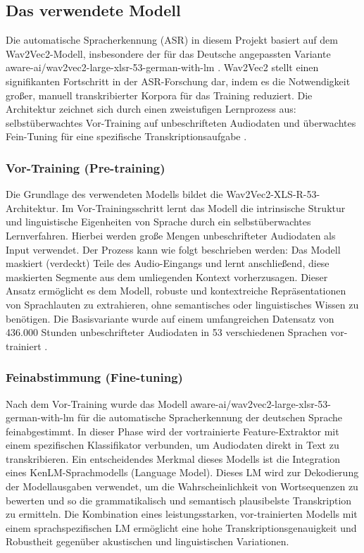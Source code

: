 \subsection{Das verwendete Modell}

Die automatische Spracherkennung (ASR) in diesem Projekt basiert auf dem Wav2Vec2-Modell, insbesondere der für das Deutsche angepassten Variante aware-ai/wav2vec2-large-xlsr-53-german-with-lm \cite{aware-ai_n.d.}. Wav2Vec2 stellt einen signifikanten Fortschritt in der ASR-Forschung dar, indem es die Notwendigkeit großer, manuell transkribierter Korpora für das Training reduziert. Die Architektur zeichnet sich durch einen zweistufigen Lernprozess aus: selbstüberwachtes Vor-Training auf unbeschrifteten Audiodaten und überwachtes Fein-Tuning für eine spezifische Transkriptionsaufgabe \cite{baevski2020wav2vec}.

\subsubsection{Vor-Training (Pre-training)}

Die Grundlage des verwendeten Modells bildet die Wav2Vec2-XLS-R-53-Architektur. Im Vor-Trainingsschritt lernt das Modell die intrinsische Struktur und linguistische Eigenheiten von Sprache durch ein selbstüberwachtes Lernverfahren. Hierbei werden große Mengen unbeschrifteter Audiodaten als Input verwendet. Der Prozess kann wie folgt beschrieben werden: Das Modell maskiert (verdeckt) Teile des Audio-Eingangs und lernt anschließend, diese maskierten Segmente aus dem umliegenden Kontext vorherzusagen. Dieser Ansatz ermöglicht es dem Modell, robuste und kontextreiche Repräsentationen von Sprachlauten zu extrahieren, ohne semantisches oder linguistisches Wissen zu benötigen. Die Basisvariante wurde auf einem umfangreichen Datensatz von 436.000 Stunden unbeschrifteter Audiodaten in 53 verschiedenen Sprachen vor-trainiert \cite{baevski2020wav2vec}.

\subsubsection{Feinabstimmung (Fine-tuning)}

Nach dem Vor-Training wurde das Modell aware-ai/wav2vec2-large-xlsr-53-german-with-lm für die automatische Spracherkennung der deutschen Sprache feinabgestimmt. In dieser Phase wird der vortrainierte Feature-Extraktor mit einem spezifischen Klassifikator verbunden, um Audiodaten direkt in Text zu transkribieren. Ein entscheidendes Merkmal dieses Modells ist die Integration eines KenLM-Sprachmodells (Language Model). Dieses LM wird zur Dekodierung der Modellausgaben verwendet, um die Wahrscheinlichkeit von Wortsequenzen zu bewerten und so die grammatikalisch und semantisch plausibelste Transkription zu ermitteln. Die Kombination eines leistungsstarken, vor-trainierten Modells mit einem sprachspezifischen LM ermöglicht eine hohe Transkriptionsgenauigkeit und Robustheit gegenüber akustischen und linguistischen Variationen.

